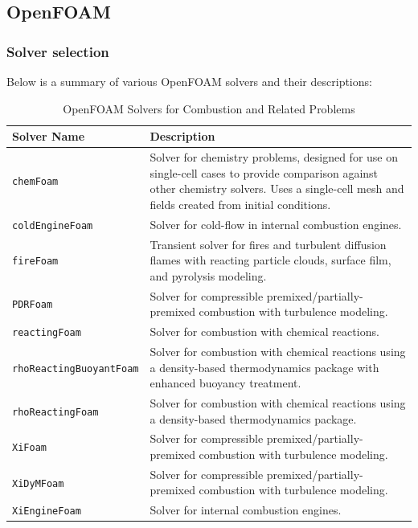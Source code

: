 \documentclass[12pt]{article}
\begin{document}
\subsection{OpenFOAM}\label{secsubsec:OF}

\subsubsection*{Solver selection}
Below is a summary of various OpenFOAM solvers and their descriptions:

\begin{table}[H]
\centering
\caption{OpenFOAM Solvers for Combustion and Related Problems}
\label{tab:openfoam-solvers}
\begin{tabular}{lp{10cm}}
\toprule
\textbf{Solver Name} & \textbf{Description} \\
\midrule
\texttt{chemFoam} & Solver for chemistry problems, designed for use on single-cell cases to provide comparison against other chemistry solvers. Uses a single-cell mesh and fields created from initial conditions. \\
\texttt{coldEngineFoam} & Solver for cold-flow in internal combustion engines. \\
\texttt{fireFoam} & Transient solver for fires and turbulent diffusion flames with reacting particle clouds, surface film, and pyrolysis modeling. \\
\texttt{PDRFoam} & Solver for compressible premixed/partially-premixed combustion with turbulence modeling. \\
\texttt{reactingFoam} & Solver for combustion with chemical reactions. \\
\texttt{rhoReactingBuoyantFoam} & Solver for combustion with chemical reactions using a density-based thermodynamics package with enhanced buoyancy treatment. \\
\texttt{rhoReactingFoam} & Solver for combustion with chemical reactions using a density-based thermodynamics package. \\
\texttt{XiFoam} & Solver for compressible premixed/partially-premixed combustion with turbulence modeling. \\
\texttt{XiDyMFoam} & Solver for compressible premixed/partially-premixed combustion with turbulence modeling. \\
\texttt{XiEngineFoam} & Solver for internal combustion engines. \\
\bottomrule
\end{tabular}
\end{table}
\end{document}
